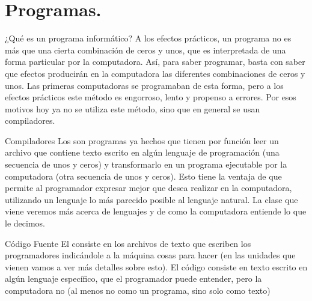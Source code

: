 \section{Programas.}


\begin{frame}{¿Qué es un programa informático?}
  A los efectos prácticos, un programa no es más que una cierta combinación de
  ceros y unos, que es interpretada de una forma particular por la computadora.
  \jump
  Así, para saber programar, basta con saber que efectos producirán en la
  computadora las diferentes combinaciones de ceros y unos.
  \jump
  Las primeras computadoras se programaban de esta forma, pero a los efectos
  prácticos este método es engorroso, lento y propenso a errores. Por esos
  motivos hoy ya no se utiliza este método, sino que en general se usan
  compiladores.
\end{frame}


\begin{frame}{Compiladores}
  Los  son programas ya hechos que tienen por función
  leer un archivo que contiene texto escrito en algún lenguaje de programación
  (una secuencia de unos y ceros) y transformarlo en un programa ejecutable
  por la computadora (otra secuencia de unos y ceros).
  \jump
  Esto tiene la ventaja de que permite al programador expresar mejor que
  desea realizar en la computadora, utilizando un lenguaje lo más parecido
  posible al lenguaje natural.
  \jump
  \jump
  La clase que viene veremos más acerca de lenguajes y de como la computadora
  entiende lo que le decimos.
\end{frame}


\begin{frame}{Código Fuente}
  El  consiste en los archivos de texto que escriben los
  programadores indicándole a la máquina cosas para hacer (en las unidades que
  vienen vamos a ver más detalles sobre esto).
  \jump
  El código consiste en texto escrito en algún lenguaje específico, que el
  programador puede entender, pero la computadora no (al menos no como un
  programa, sino solo como texto)
\end{frame}


